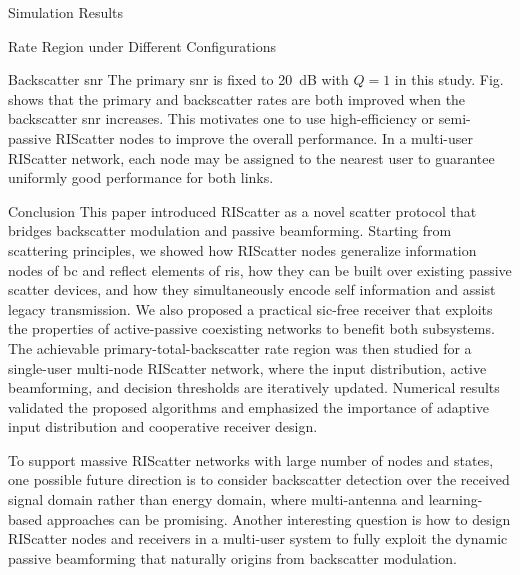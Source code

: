 \documentclass[journal]{IEEEtran}
\begin{document}
\begin{section}{Simulation Results}
\begin{subsection}{Rate Region under Different Configurations}
		\begin{subsubsection}{Backscatter \gls{snr}}
			The primary \gls{snr} is fixed to \qty{20}{dB} with $Q=1$ in this study.
			Fig.~ shows that the primary and backscatter rates are both improved when the backscatter \gls{snr} increases.
			This motivates one to use high-efficiency or semi-passive RIScatter nodes to improve the overall performance.
			In a multi-user RIScatter network, each node may be assigned to the nearest user to guarantee uniformly good performance for both links.
		\end{subsubsection}
	\end{subsection}
\end{section}

\begin{section}{Conclusion}
	\label{sc:conclusion}
	This paper introduced RIScatter as a novel scatter protocol that bridges backscatter modulation and passive beamforming.
	Starting from scattering principles, we showed how RIScatter nodes generalize information nodes of \gls{bc} and reflect elements of \gls{ris}, how they can be built over existing passive scatter devices, and how they simultaneously encode self information and assist legacy transmission.
	We also proposed a practical \gls{sic}-free receiver that exploits the properties of active-passive coexisting networks to benefit both subsystems.
	The achievable primary-total-backscatter rate region was then studied for a single-user multi-node RIScatter network, where the input distribution, active beamforming, and decision thresholds are iteratively updated.
	Numerical results validated the proposed algorithms and emphasized the importance of adaptive input distribution and cooperative receiver design.

	To support massive RIScatter networks with large number of nodes and states, one possible future direction is to consider backscatter detection over the received signal domain rather than energy domain, where multi-antenna \cite{Liu2022c} and learning-based approaches can be promising.
	Another interesting question is how to design RIScatter nodes and receivers in a multi-user system to fully exploit the dynamic passive beamforming that naturally origins from backscatter modulation.
\end{section}
\end{document}
